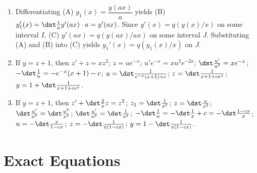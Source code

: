 \documentclass[openany]{book}
\newenvironment{sectionSolutions}{
 \begin{enumerate}[item-label={\thesection.\arabic{enumi}.}]
}{
 \end{enumerate}
}
\begin{document}
\begin{sectionSolutions}
\item
Differentiating  (A) $y_1(x)=\dfrac{y(ax)}{ a}$   yields
(B) $y_1'(x)=\dst\frac{1}{ a}y'(ax)\cdot a=y'(ax)$. Since
$y'(x)=q(y(x)/x)$ on some interval $I$, (C) $y'(ax)=q(y(ax)/ax)$
on some interval $J$. Substituting (A) and (B) into (C)
yields $y_1'(x)=q(y_1(x)/x)$ on $J$.


\item
  If $y=z+1$, then
$z'+z=xz^2$;\;
$z=ue^{-x}$;\;
$u'e^{-x}=xu^2e^{-2x}$;\;
$\dst\frac{u'}{ u^2}=xe^{-x}$;\;
$-\dst\frac{1}{ u}=-e^{-x}(x+1)-c$;\;
$u=\dst\frac{1}{ e^{-x}(x+1)+c}$;\;
$z=\dst\frac{1}{ x+1+ce^x}$;\;
$y=1+\dst\frac{1}{ x+1+ce^x}$.


\item
If $y=z+1$, then
$z'+\dst\frac{2}{ x}z=z^2$;\;
$z_1=\dst\frac{1}{ x^2}$;\;
$z=\dst\frac{u}{ x^2}$;\;
$\dst\frac{u'}{ x^2}=\dst\frac{u^2}{ x^4}$;\;
$\dst\frac{u'}{ u^2}=\dst\frac{1}{ x^2}$;\;
$-\dst\frac{1}{ u}=-\dst\frac{1}{ x}+c=-\dst\frac{1-cx}{ x}$;\;
$u=-\dst\frac{x}{ 1-cx}$;\;
$z=-\dst\frac{1}{ x(1-cx)}$;\;
$y=1-\dst\frac{1}{ x(1-cx)}$.

\end{sectionSolutions}

\section{Exact Equations}
\end{document}
